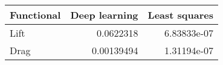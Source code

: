 \begin{tabular}{lrr}
\toprule
 Functional   &   Deep learning &   Least squares \\
\midrule
 Lift         &      0.0622318  &     6.83833e-07 \\
 Drag         &      0.00139494 &     1.31194e-07 \\
\bottomrule
\end{tabular}
